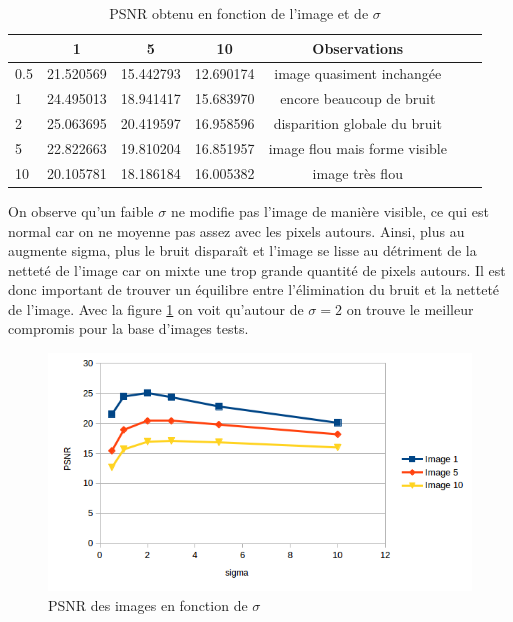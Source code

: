\documentclass[paper=a4, fontsize=11pt]{scrartcl} %
\begin{document}
\begin{table}[h!]
\caption{PSNR obtenu en fonction de l'image et de $\sigma$}
\begin{tabular}{|l|c|c|c|c|c|c|}

	\hline
	\backslashbox{$\sigma$}{Numéro image} & 1 & 5 & 10 & Observations\\ 
	\hline
	
	0.5 & 21.520569 & 15.442793 & 12.690174 & image quasiment inchangée \\
	\hline
	1 & 24.495013 & 18.941417 & 15.683970 & encore beaucoup de bruit\\
	\hline
	2 & 25.063695 & 20.419597 & 16.958596 &  disparition globale du bruit \\
	\hline
	5 & 22.822663 & 19.810204 & 16.851957 & image flou mais forme visible \\ 
	\hline
	10 & 20.105781  & 18.186184 & 16.005382 & image très flou \\
	\hline

\end{tabular}

\end{table}
On observe qu'un faible $\sigma$ ne modifie pas l'image de manière visible, ce qui est normal car on ne moyenne pas assez avec les pixels autours. Ainsi, plus au augmente sigma, plus le bruit disparaît et l'image se lisse au détriment de la netteté de l'image car on mixte une trop grande quantité de pixels autours. Il est donc important de trouver un équilibre entre l'élimination du bruit et la netteté de l'image. Avec la figure \ref{tracer1} on voit qu'autour de $\sigma=2$ on trouve le meilleur compromis pour la base d'images tests.

\begin{figure}[h!]
\centering
\caption{PSNR des images en fonction de $\sigma$}
\label{tracer1}
\includegraphics[scale=1]{images/rapport/courbes/pnsr1.png}
\end{figure}
\end{document}
